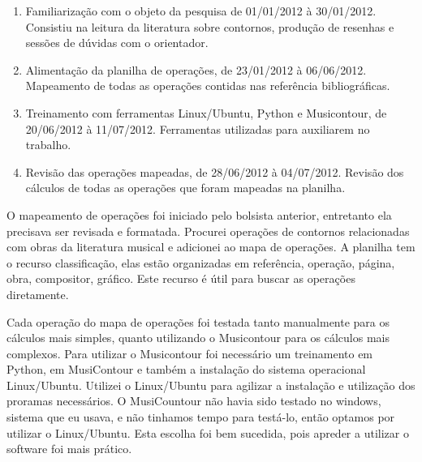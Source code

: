 \documentclass[11pt]{article}
\begin{document}
\begin{enumerate}
\item Familiarização com o objeto da pesquisa de 01/01/2012 à 30/01/2012.
Consistiu na leitura da literatura sobre contornos, produção de resenhas
e sessões de dúvidas com o orientador.
\item Alimentação da planilha de operações, de 23/01/2012 à 06/06/2012.
Mapeamento de todas as operações contidas nas referência
bibliográficas.
\item Treinamento com ferramentas Linux/Ubuntu, Python e Musicontour, de 20/06/2012 à 11/07/2012.
Ferramentas utilizadas para auxiliarem no trabalho.
\item Revisão das operações mapeadas, de 28/06/2012 à 04/07/2012.
Revisão dos cálculos de todas as operações que foram mapeadas na planilha.
\end{enumerate}

O mapeamento de operações foi iniciado pelo bolsista anterior,
entretanto ela precisava ser revisada e formatada.  Procurei operações
de contornos relacionadas com obras da literatura musical e adicionei
ao mapa de operações.
A planilha tem o recurso classificação, elas estão organizadas em
referência, operação, página, obra, compositor, gráfico.  Este recurso
é útil para buscar as operações diretamente.

Cada operação do mapa de operações foi testada tanto manualmente para os
cálculos mais simples, quanto utilizando o Musicontour para os cálculos mais
complexos. Para utilizar o Musicontour foi necessário um treinamento em Python,
em MusiContour e também a instalação do sistema operacional
Linux/Ubuntu.
Utilizei o Linux/Ubuntu para
agilizar a instalação e utilização dos proramas necessários. O MusiCountour não
havia sido testado no windows, sistema que eu usava, e não
tinhamos tempo para testá-lo, então optamos por utilizar o
Linux/Ubuntu.
Esta escolha foi bem sucedida, pois apreder a utilizar o software
foi mais prático.
\end{document}
